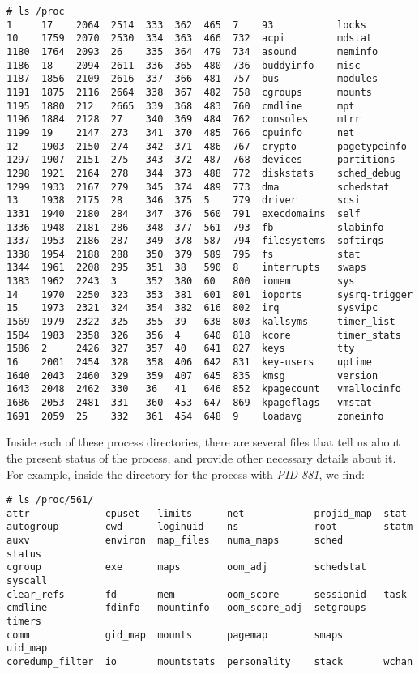 \vspace{-15pt}
\begin{verbatim}
# ls /proc
1     17    2064  2514  333  362  465  7    93           locks
10    1759  2070  2530  334  363  466  732  acpi         mdstat
1180  1764  2093  26    335  364  479  734  asound       meminfo
1186  18    2094  2611  336  365  480  736  buddyinfo    misc
1187  1856  2109  2616  337  366  481  757  bus          modules
1191  1875  2116  2664  338  367  482  758  cgroups      mounts
1195  1880  212   2665  339  368  483  760  cmdline      mpt
1196  1884  2128  27    340  369  484  762  consoles     mtrr
1199  19    2147  273   341  370  485  766  cpuinfo      net
12    1903  2150  274   342  371  486  767  crypto       pagetypeinfo
1297  1907  2151  275   343  372  487  768  devices      partitions
1298  1921  2164  278   344  373  488  772  diskstats    sched_debug
1299  1933  2167  279   345  374  489  773  dma          schedstat
13    1938  2175  28    346  375  5    779  driver       scsi
1331  1940  2180  284   347  376  560  791  execdomains  self
1336  1948  2181  286   348  377  561  793  fb           slabinfo
1337  1953  2186  287   349  378  587  794  filesystems  softirqs
1338  1954  2188  288   350  379  589  795  fs           stat
1344  1961  2208  295   351  38   590  8    interrupts   swaps
1383  1962  2243  3     352  380  60   800  iomem        sys
14    1970  2250  323   353  381  601  801  ioports      sysrq-trigger
15    1973  2321  324   354  382  616  802  irq          sysvipc
1569  1979  2322  325   355  39   638  803  kallsyms     timer_list
1584  1983  2358  326   356  4    640  818  kcore        timer_stats
1586  2     2426  327   357  40   641  827  keys         tty
16    2001  2454  328   358  406  642  831  key-users    uptime
1640  2043  2460  329   359  407  645  835  kmsg         version
1643  2048  2462  330   36   41   646  852  kpagecount   vmallocinfo
1686  2053  2481  331   360  453  647  869  kpageflags   vmstat
1691  2059  25    332   361  454  648  9    loadavg      zoneinfo
\end{verbatim}
\vspace{-10pt}	

\noindent
Inside each of these process directories, there are several files that tell us about the present status of the process, and provide other necessary details about it. For example, inside the directory for the process with \textit{PID 881}, we find:

\vspace{-15pt}
\begin{verbatim}
# ls /proc/561/
attr             cpuset   limits      net            projid_map  stat
autogroup        cwd      loginuid    ns             root        statm
auxv             environ  map_files   numa_maps      sched       status
cgroup           exe      maps        oom_adj        schedstat   syscall
clear_refs       fd       mem         oom_score      sessionid   task
cmdline          fdinfo   mountinfo   oom_score_adj  setgroups   timers
comm             gid_map  mounts      pagemap        smaps       uid_map
coredump_filter  io       mountstats  personality    stack       wchan
\end{verbatim}
\vspace{-10pt}	


